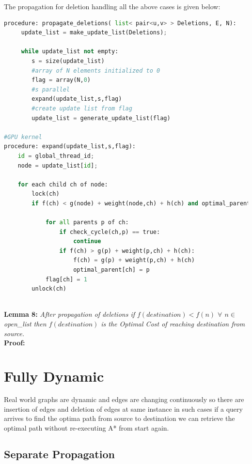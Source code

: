 \documentclass[a4paper]{article}
\begin{document}
The propagation for deletion handling all the above cases is given below:
\begin{lstlisting}[language=python, caption=Propagation of Deletions]
procedure: propagate_deletions( list< pair<u,v> > Deletions, E, N):
     update_list = make_update_list(Deletions);
     
     while update_list not empty:
        s = size(update_list)
        #array of N elements initialized to 0
        flag = array(N,0)
        #s parallel
        expand(update_list,s,flag)
        #create update list from flag
        update_list = generate_update_list(flag)

#GPU kernel
procedure: expand(update_list,s,flag):
    id = global_thread_id;
    node = update_list[id];
    
    for each child ch of node:
        lock(ch)
        if f(ch) < g(node) + weight(node,ch) + h(ch) and optimal_parent[ch] == node:
            
            for all parents p of ch:
                if check_cycle(ch,p) == true:
                    continue
                if f(ch) > g(p) + weight(p,ch) + h(ch):
                    f(ch) = g(p) + weight(p,ch) + h(ch)
                    optimal_parent[ch] = p
            flag[ch] = 1
        unlock(ch)
        
\end{lstlisting}

\textbf{Lemma 8:} \textit{After propagation of deletions if $f(destination) < f(n)$ $ \forall$ $n \in $open\_list then $f(destination)$ is the Optimal Cost of reaching destination from source.}\\
\textbf{Proof:}



\section{Fully Dynamic}
Real world graphs are dynamic and edges are changing continuously so there are insertion of edges and deletion of edges at same instance in such cases if a query arrives to find the optima path from source to destination we can retrieve the optimal path without re-executing A* from start again.

\subsection{Separate Propagation }
\end{document}

